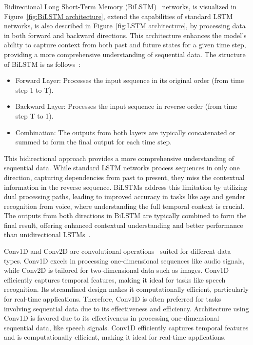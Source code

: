 \documentclass[conference, 10pt,onecolumn]{IEEEtran}
\begin{document}
Bidirectional Long Short-Term Memory (BiLSTM)~\cite{yu2019review} networks, is visualized in Figure~\ref{fig:BiLSTM architecture}, extend the capabilities of standard LSTM networks, is also described in Figure~\ref{fig:LSTM architecture}, by processing data in both forward and backward directions. This architecture enhances the model's ability to capture context from both past and future states for a given time step, providing a more comprehensive understanding of sequential data. The structure of BiLSTM is as follows~\cite{yu2019review}:
\begin{itemize}
    \item Forward Layer: Processes the input sequence in its original order (from time step 1 to T).
    \item Backward Layer: Processes the input sequence in reverse order (from time step T to 1).
    \item Combination: The outputs from both layers are typically concatenated or summed to form the final output for each time step.
\end{itemize}
This bidirectional approach provides a more comprehensive understanding of sequential data. While standard LSTM networks process sequences in only one direction, capturing dependencies from past to present, they miss the contextual information in the reverse sequence. BiLSTMs address this limitation by utilizing dual processing paths, leading to improved accuracy in tasks like age and gender recognition from voice, where understanding the full temporal context is crucial. The outputs from both directions in BiLSTM are typically combined to form the final result, offering enhanced contextual understanding and better performance than unidirectional LSTMs~\cite{yu2019review}.

Conv1D and Conv2D are convolutional operations~\cite{chua1998cnn} suited for different data types. Conv1D excels in processing one-dimensional sequences like audio signals, while Conv2D is tailored for two-dimensional data such as images. Conv1D efficiently captures temporal features, making it ideal for tasks like speech recognition. Its streamlined design makes it computationally efficient, particularly for real-time applications. Therefore, Conv1D is often preferred for tasks involving sequential data due to its effectiveness and efficiency. Architecture using Conv1D is favored due to its effectiveness in processing one-dimensional sequential data, like speech signals. Conv1D efficiently captures temporal features and is computationally efficient, making it ideal for real-time applications.
\end{document}
